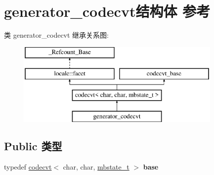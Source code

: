 \hypertarget{structgenerator__codecvt}{}\section{generator\+\_\+codecvt结构体 参考}
\label{structgenerator__codecvt}
类 generator\+\_\+codecvt 继承关系图\+:\begin{figure}[H]
\begin{center}
\leavevmode
\includegraphics[height=4.000000cm]{structgenerator__codecvt}
\end{center}
\end{figure}
\subsection*{Public 类型}
\begin{DoxyCompactItemize}
\item 
\mbox{\label{structgenerator__codecvt_a745ebdede511e15b216853191af99812}} 
typedef \hyperlink{classcodecvt}{codecvt}$<$ char, char, \hyperlink{struct____mbstate__t}{mbstate\+\_\+t} $>$ {\bfseries base}
\end{DoxyCompactItemize}
